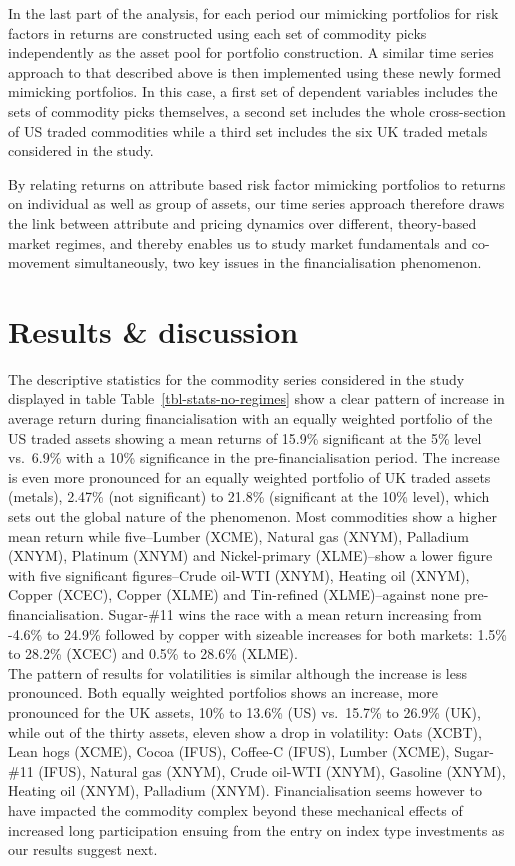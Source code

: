 \documentclass[
  authoryear,
  preprint,
  3p]{elsarticle}
\begin{document}
\medskip

In the last part of the analysis, for each period our mimicking
portfolios for risk factors in returns are constructed using each set of
commodity picks independently as the asset pool for portfolio
construction. A similar time series approach to that described above is
then implemented using these newly formed mimicking portfolios. In this
case, a first set of dependent variables includes the sets of commodity
picks themselves, a second set includes the whole cross-section of US
traded commodities while a third set includes the six UK traded metals
considered in the study.

\bigskip
\bigskip

By relating returns on attribute based risk factor mimicking portfolios
to returns on individual as well as group of assets, our time series
approach therefore draws the link between attribute and pricing dynamics
over different, theory-based market regimes, and thereby enables us to
study market fundamentals and co-movement simultaneously, two key issues
in the financialisation phenomenon.

\newpage

\section{Results \& discussion}\label{sec-results}

The descriptive statistics for the commodity series considered in the
study displayed in table Table~\ref{tbl-stats-no-regimes} show a clear
pattern of increase in average return during financialisation with an
equally weighted portfolio of the US traded assets showing a mean
returns of 15.9\% significant at the 5\% level vs.~6.9\% with a 10\%
significance in the pre-financialisation period. The increase is even
more pronounced for an equally weighted portfolio of UK traded assets
(metals), 2.47\% (not significant) to 21.8\% (significant at the 10\%
level), which sets out the global nature of the phenomenon. Most
commodities show a higher mean return while five--Lumber (XCME), Natural
gas (XNYM), Palladium (XNYM), Platinum (XNYM) and Nickel-primary
(XLME)--show a lower figure with five significant figures--Crude oil-WTI
(XNYM), Heating oil (XNYM), Copper (XCEC), Copper (XLME) and Tin-refined
(XLME)--against none pre-financialisation. Sugar-\#11 wins the race with
a mean return increasing from -4.6\% to 24.9\% followed by copper with
sizeable increases for both markets: 1.5\% to 28.2\% (XCEC) and 0.5\% to
28.6\% (XLME).\\
The pattern of results for volatilities is similar although the increase
is less pronounced. Both equally weighted portfolios shows an increase,
more pronounced for the UK assets, 10\% to 13.6\% (US) vs.~15.7\% to
26.9\% (UK), while out of the thirty assets, eleven show a drop in
volatility: Oats (XCBT), Lean hogs (XCME), Cocoa (IFUS), Coffee-C
(IFUS), Lumber (XCME), Sugar-\#11 (IFUS), Natural gas (XNYM), Crude
oil-WTI (XNYM), Gasoline (XNYM), Heating oil (XNYM), Palladium (XNYM).
Financialisation seems however to have impacted the commodity complex
beyond these mechanical effects of increased long participation ensuing
from the entry on index type investments as our results suggest next.
\end{document}
